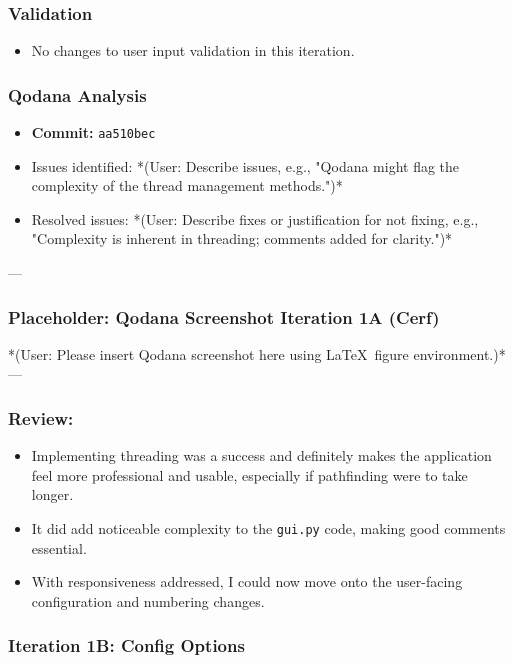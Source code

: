 \subsubsection{Validation}
\begin{itemize}
	\item No changes to user input validation in this iteration.
\end{itemize}

\subsubsection{Qodana Analysis}
\begin{itemize}
	\item \textbf{Commit:} \verb|aa510bec|
	\item Issues identified: *(User: Describe issues, e.g., "Qodana might flag the complexity of the thread management methods.")*
	\item Resolved issues: *(User: Describe fixes or justification for not fixing, e.g., "Complexity is inherent in threading; comments added for clarity.")*
\end{itemize}

--- %
\subsubsection*{Placeholder: Qodana Screenshot Iteration 1A (Cerf)}
*(User: Please insert Qodana screenshot here using \LaTeX\ figure environment.)*
---

\subsubsection{Review:}
\begin{itemize}
	\item Implementing threading was a success and definitely makes the application feel more professional and usable, especially if pathfinding were to take longer.
	\item It did add noticeable complexity to the \verb|gui.py| code, making good comments essential.
	\item With responsiveness addressed, I could now move onto the user-facing configuration and numbering changes.
\end{itemize}

\newpage

\subsubsection{Iteration 1B: Config Options}

